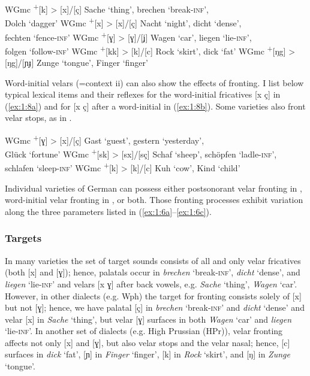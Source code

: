 \ea%
    \label{ex:1:7}
\ea\label{ex:1:7a}WGmc \textsuperscript{+}[k] >   [x]/[ç]   \tab Sache ‘thing’, brechen ‘break-\textsc{inf}’, \\ \tab Dolch ‘dagger’
\ex\label{ex:1:7b}WGmc \textsuperscript{+}[x] >   [x]/[ç]  \tab Nacht ‘night’, dicht ‘dense’,\\ \tab fechten ‘fence-\textsc{inf}’
\ex\label{ex:1:7c}WGmc \textsuperscript{+}[ɣ] >   [ɣ]/[ʝ]  \tab Wagen ‘car’, liegen ‘lie-\textsc{inf}’, \\ \tab folgen ‘follow-\textsc{inf}’
\ex\label{ex:1:7d}WGmc \textsuperscript{+}[kk] > [k]/[c]  \tab Rock ‘skirt’, dick ‘fat’
\ex\label{ex:1:7e}WGmc \textsuperscript{+}[ŋg] > [ŋg]/[ɲɟ] \tab Zunge ‘tongue’, Finger ‘finger’
\z
\z

Word-initial velars (=context ii) can also show the effects of fronting. I list below typical lexical items and their  reflexes for the word-initial fricatives [x ç] in (\ref{ex:1:8a}) and for [x ç] after a word-initial  in (\ref{ex:1:8b}). Some varieties also front velar stops, as in . 

\ea%
\label{ex:1:8}
\ea\label{ex:1:8a}WGmc \textsuperscript{+}[ɣ] >   [x]/[ç] \tab Gast ‘guest’, gestern ‘yesterday’,\\ \tab Glück ‘fortune’
\ex\label{ex:1:8b}WGmc \textsuperscript{+}[sk] > [sx]/[sç] \tab Schaf ‘sheep’, schöpfen ‘ladle-\textsc{inf}’,\\ \tab schlafen ‘sleep-\textsc{inf}’
\ex\label{ex:1:8c}WGmc \textsuperscript{+}[k] >   [k]/[c] \tab Kuh ‘cow’, Kind ‘child’
\z
\z

Individual varieties of German can possess either postsonorant velar fronting in , word-initial velar fronting in , or both. Those fronting processes exhibit variation along the three parameters listed in (\ref{ex:1:6a}--\ref{ex:1:6c}).

\subsubsection{Targets} In many varieties the set of target sounds consists of all and only velar fricatives (both [x] and [ɣ]); hence, palatals occur in \textit{brechen} ‘break-\textsc{inf}’, \textit{dicht} ‘dense’, and \textit{liegen} ‘lie-\textsc{inf}’ and velars [x ɣ] after back vowels, e.g. \textit{Sache} ‘thing’, \textit{Wagen} ‘car’. However, in other dialects (e.g. Wph) the target for fronting consists solely of [x] but not [ɣ]; hence, we have palatal [ç] in \textit{brechen} ‘break-\textsc{inf}’ and \textit{dicht} ‘dense’ and velar [x] in \textit{Sache} ‘thing’, but velar [ɣ] surfaces in both \textit{Wagen} ‘car’ and \textit{liegen} ‘lie-\textsc{inf}’. In another set of dialects (e.g. High Prussian (HPr)), velar fronting affects not only [x] and [ɣ], but also velar stops and the velar nasal; hence, [c] surfaces in \textit{dick} ‘fat’, [ɲ] in \textit{Finger} ‘finger’, [k] in \textit{Rock} ‘skirt’, and [ŋ] in \textit{Zunge} ‘tongue’.

